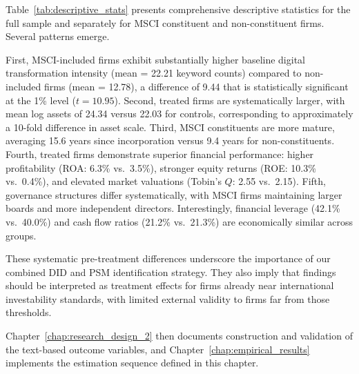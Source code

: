 Table~\ref{tab:descriptive_stats} presents comprehensive descriptive statistics for the full sample and separately for MSCI constituent and non-constituent firms. Several patterns emerge.

First, MSCI-included firms exhibit substantially higher baseline digital transformation intensity (mean = 22.21 keyword counts) compared to non-included firms (mean = 12.78), a difference of 9.44 that is statistically significant at the 1\% level ($t = 10.95$). Second, treated firms are systematically larger, with mean log assets of 24.34 versus 22.03 for controls, corresponding to approximately a 10-fold difference in asset scale. Third, MSCI constituents are more mature, averaging 15.6 years since incorporation versus 9.4 years for non-constituents. Fourth, treated firms demonstrate superior financial performance: higher profitability (ROA: 6.3\% vs.\ 3.5\%), stronger equity returns (ROE: 10.3\% vs.\ 0.4\%), and elevated market valuations (Tobin's $Q$: 2.55 vs.\ 2.15). Fifth, governance structures differ systematically, with MSCI firms maintaining larger boards and more independent directors. Interestingly, financial leverage (42.1\% vs.\ 40.0\%) and cash flow ratios (21.2\% vs.\ 21.3\%) are economically similar across groups.

These systematic pre-treatment differences underscore the importance of our combined DID and PSM identification strategy.
They also imply that findings should be interpreted as treatment effects for firms already near international investability standards, with limited external validity to firms far from those thresholds.

Chapter~\ref{chap:research_design_2} then documents construction and validation of the text-based outcome variables, and Chapter~\ref{chap:empirical_results} implements the estimation sequence defined in this chapter.
